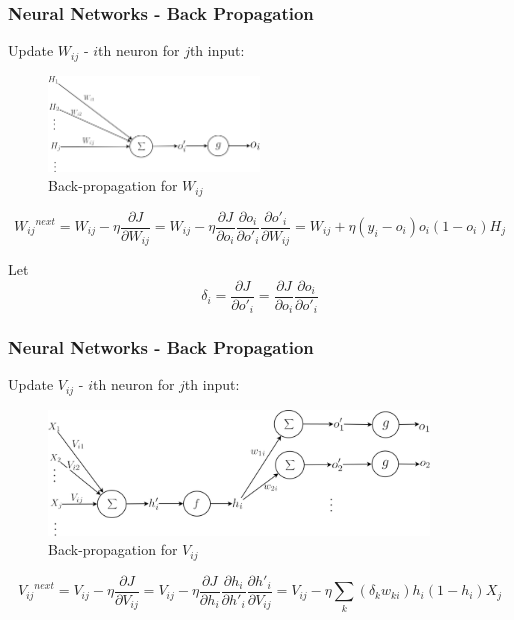 \documentclass{beamer}
\begin{document}
\begin{frame}
\frametitle{Neural Networks - Back Propagation}
Update $W_{ij}$ - $i$th neuron for $j$th input:
\begin{figure}[t!]
    \centering
    \includegraphics[width=0.5\textwidth]{../paper/pictures/figures/BP1.png}
    \caption{Back-propagation for $W_{ij}$}
    \label{fig:BP1}
\end{figure}

$$
{{W_{ij}}^{next}}
= W_{ij} - \eta\frac{\partial J}{\partial W_{ij}}
= W_{ij} - \eta\frac{\partial J}{\partial o_i}\frac{\partial o_i}{\partial o'_i}\frac{\partial o'_i}{\partial W_{ij}}
= W_{ij} + \eta(y_i-o_i)o_i(1-o_i)H_j
$$

Let
$$
\delta_i
= \frac{\partial J}{\partial o'_i}
= \frac{\partial J}{\partial o_i}\frac{\partial o_i}{\partial o'_i}
$$
\end{frame}

\begin{frame}
\frametitle{Neural Networks - Back Propagation}
Update $V_{ij}$ - $i$th neuron for $j$th input:
\begin{figure}[t!]
    \centering
    \includegraphics[width=0.9\textwidth]{../paper/pictures/figures/BP2.png}
    \caption{Back-propagation for $V_{ij}$}
    \label{fig:BP2}
\end{figure}
$$
{{V_{ij}}^{next}}
= V_{ij} - \eta\frac{\partial J}{\partial V_{ij}}
= V_{ij} - \eta\frac{\partial J}{\partial h_i}\frac{\partial h_i}{\partial h'_i}\frac{\partial h'_i}{\partial V_{ij}}
= V_{ij} - \eta\sum_k(\delta_kw_{ki})h_i(1-h_i)X_j
$$

\end{frame}
\end{document}
